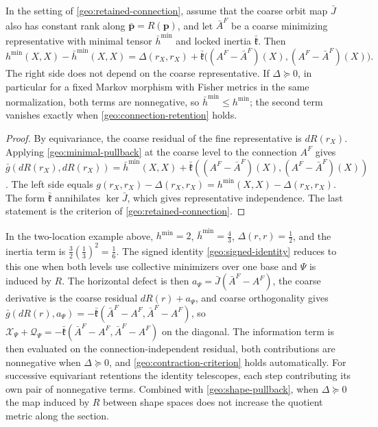 In the setting of \cref{geo:retained-connection}, assume that the coarse orbit map $\bar J$ also has constant rank along $\bar{\boldsymbol p}=R(\boldsymbol p)$, and let $\bar A^F$ be a coarse minimizing representative with minimal tensor $\bar h^{\min}$ and locked inertia $\bar{\mathfrak k}$. Then
\begin{equation}
h^{\min}(X,X)-\bar h^{\min}(X,X)
=\Delta(r_X,r_X)
+\bar{\mathfrak k}\bigl((A^F-\bar A^F)(X),(A^F-\bar A^F)(X)\bigr).
\label{geo:minimal-contraction-identity}
\end{equation}
The right side does not depend on the coarse representative. If $\Delta\succeq0$, in particular for a fixed Markov morphism with Fisher metrics in the same normalization, both terms are nonnegative, so $\bar h^{\min}\le h^{\min}$; the second term vanishes exactly when \cref{geo:connection-retention} holds.
\begin{proof}
By equivariance, the coarse residual of the fine representative is $dR(r_X)$. Applying \cref{geo:minimal-pullback} at the coarse level to the connection $A^F$ gives $\bar g(dR(r_X),dR(r_X))=\bar h^{\min}(X,X)+\bar{\mathfrak k}((A^F-\bar A^F)(X),(A^F-\bar A^F)(X))$. The left side equals $g(r_X,r_X)-\Delta(r_X,r_X)=h^{\min}(X,X)-\Delta(r_X,r_X)$. The form $\bar{\mathfrak k}$ annihilates $\ker\bar J$, which gives representative independence. The last statement is the criterion of \cref{geo:retained-connection}.
\end{proof}
In the two-location example above, $h^{\min}=2$, $\bar h^{\min}=\tfrac43$, $\Delta(r,r)=\tfrac12$, and the inertia term is $\tfrac32(\tfrac13)^2=\tfrac16$. The signed identity \cref{geo:signed-identity} reduces to this one when both levels use collective minimizers over one base and $\Psi$ is induced by $R$. The horizontal defect is then $a_\Psi=\bar J(\bar A^F-A^F)$, the coarse derivative is the coarse residual $dR(r)+a_\Psi$, and coarse orthogonality gives $\bar g(dR(r),a_\Psi)=-\bar{\mathfrak k}(\bar A^F-A^F,\bar A^F-A^F)$, so $\mathcal X_\Psi+\mathcal Q_\Psi=-\bar{\mathfrak k}(\bar A^F-A^F,\bar A^F-A^F)$ on the diagonal. The information term is then evaluated on the connection-independent residual, both contributions are nonnegative when $\Delta\succeq0$, and \cref{geo:contraction-criterion} holds automatically. For successive equivariant retentions the identity telescopes, each step contributing its own pair of nonnegative terms. Combined with \cref{geo:shape-pullback}, when $\Delta\succeq0$ the map induced by $R$ between shape spaces does not increase the quotient metric along the section.
